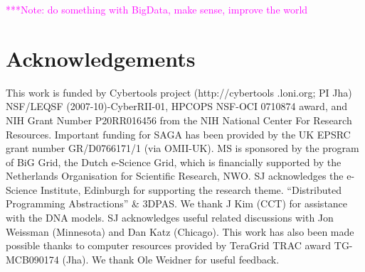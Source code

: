\documentclass[conference,final]{IEEEtran}
\newcommand{\note}[1]{ {\textcolor{magenta} { ***Note: #1 }}}
\newcommand{\note}[1]{}
\newcommand{\upp}{\vspace*{-0.5em}}
\begin{document}
\note{do something with BigData, make sense, improve the world}

\section*{Acknowledgements\upp\upp}
\footnotesize{This work is funded by Cybertools project
  (http://cybertools .loni.org; PI Jha) NSF/LEQSF
  (2007-10)-CyberRII-01, HPCOPS NSF-OCI 0710874 award, and NIH Grant
  Number P20RR016456 from the NIH National Center For Research
  Resources. Important funding for SAGA has been provided by the UK
  EPSRC grant number GR/D0766171/1 (via OMII-UK).  MS is sponsored by
  the program of BiG Grid, the Dutch e-Science Grid, which is
  financially supported by the Netherlands Organisation for Scientific
  Research, NWO. SJ acknowledges the e-Science Institute, Edinburgh
  for supporting the research theme. ``Distributed Programming
  Abstractions'' \& 3DPAS. We thank J Kim (CCT) for assistance with
  the DNA models.  SJ acknowledges useful related discussions with Jon
  Weissman (Minnesota) and Dan Katz (Chicago). This work has also been
  made possible thanks to computer resources provided by TeraGrid TRAC
  award TG-MCB090174 (Jha). We thank Ole Weidner for useful feedback.}


\end{document}
